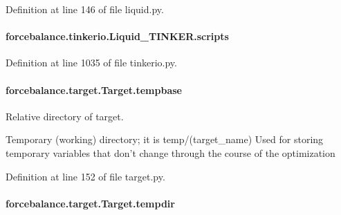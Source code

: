 Definition at line 146 of file liquid.\-py.

\hypertarget{classforcebalance_1_1tinkerio_1_1Liquid__TINKER_a426ef9f0db4235ed46b433c51e1a5fef}{
\paragraph[{scripts}]{\setlength{\rightskip}{0pt plus 5cm}forcebalance.\-tinkerio.\-Liquid\-\_\-\-T\-I\-N\-K\-E\-R.\-scripts}}\label{classforcebalance_1_1tinkerio_1_1Liquid__TINKER_a426ef9f0db4235ed46b433c51e1a5fef}


Definition at line 1035 of file tinkerio.\-py.

\hypertarget{classforcebalance_1_1target_1_1Target_ae5b544d3e11365865813ef3d626ef81d}{
\paragraph[{tempbase}]{\setlength{\rightskip}{0pt plus 5cm}forcebalance.\-target.\-Target.\-tempbase\hspace{0.3cm}{\ttfamily [inherited]}}}\label{classforcebalance_1_1target_1_1Target_ae5b544d3e11365865813ef3d626ef81d}


Relative directory of target. 

Temporary (working) directory; it is temp/(target\-\_\-name) Used for storing temporary variables that don't change through the course of the optimization 

Definition at line 152 of file target.\-py.

\hypertarget{classforcebalance_1_1target_1_1Target_aa1f01b5b78db253b5b66384ed11ed193}{
\paragraph[{tempdir}]{\setlength{\rightskip}{0pt plus 5cm}forcebalance.\-target.\-Target.\-tempdir\hspace{0.3cm}{\ttfamily [inherited]}}}\label{classforcebalance_1_1target_1_1Target_aa1f01b5b78db253b5b66384ed11ed193}


